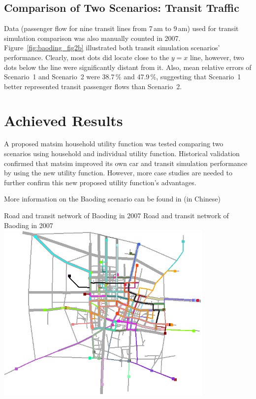 \subsection{Comparison of Two Scenarios: Transit Traffic}
Data (passenger flow for nine transit lines from 7\,am to 9\,am) used for transit simulation comparison was also manually counted in 2007. Figure~\ref{fig:baoding_fig2b} illustrated both transit simulation scenarios' performance. 
Clearly, most dots did locate close to the $y=x$ line, however, two dots below the line were significantly distant from it. 
Also, mean relative errors of Scenario~1 and Scenario~2 were 38.7\,\% and 47.9\,\%, suggesting 
that Scenario~1 better represented transit passenger flows than Scenario~2. 

\section{Achieved Results}
A proposed \gls{matsim} household utility function was tested comparing two scenarios using household and individual utility function. Historical validation confirmed that \gls{matsim} improved its own car and transit simulation performance by using the new utility function. 
However, more case studies are needed to further confirm this new proposed utility function's advantages.

More information on the Baoding scenario can be found in \citet[][]{Zhuge_PhDThesis_2014} (in Chinese) 

\createfigure%
{Road and transit network of Baoding in 2007}%
{Road and transit network of Baoding in 2007}%
{\label{fig:baoding_fig1}}%
{\includegraphics[width=0.8\textwidth, angle=0]{scenarios/figures/baoding_fig1.png}}%
{}

